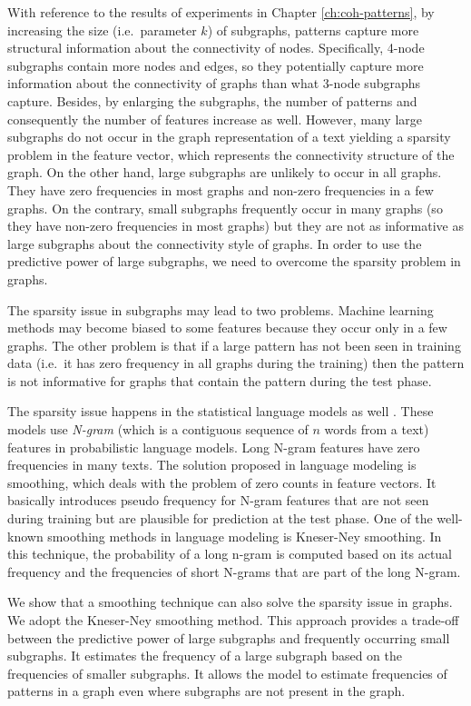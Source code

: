 With reference to the results of experiments in Chapter \ref{ch:coh-patterns}, 
by increasing the size (i.e.\ parameter $k$) of subgraphs, patterns capture more
structural information about the connectivity of nodes. 
Specifically, 4-node subgraphs contain more nodes and edges, so they potentially capture more information about the connectivity of graphs than what 3-node subgraphs capture.  
Besides, by enlarging the subgraphs, the number of patterns and consequently the number of features increase as well.   
However, many large subgraphs do not occur in the graph representation of a text yielding a sparsity problem in the feature vector, which represents the connectivity structure of the graph.  
On the other hand, large subgraphs are unlikely to occur in all graphs. 
They have zero frequencies in most graphs and non-zero frequencies in a few graphs.  
On the contrary, small subgraphs frequently occur in many graphs (so they have non-zero frequencies in most graphs) but
they are not as informative as large subgraphs about the
connectivity style of graphs. 
In order to use the predictive power of large subgraphs, we need to overcome the sparsity problem in graphs. 
  
The sparsity issue in subgraphs may lead to two problems. 
Machine learning methods may become biased to some features because they occur only in a few graphs. 
The other problem is that if a large pattern has not been seen in training data (i.e.\ it has zero frequency in all graphs during the training) then the pattern is not informative for graphs that contain the pattern during the test phase.  

The sparsity issue happens in the statistical language models as well \cite{jurafsky08}. 
These models use \emph{N-gram} (which is a contiguous sequence of $n$ words from a text) features in probabilistic language models. 
Long N-gram features have zero frequencies in many texts.  
The solution proposed in language modeling is smoothing, which deals with the problem of zero counts in feature vectors. 
It basically introduces pseudo frequency for N-gram features that are not seen during training but are plausible for prediction at the test phase. 
One of the \mbox{well-known} smoothing methods in language modeling is \mbox{Kneser-Ney} smoothing. 
In this technique, the probability of a long n-gram is computed based on its actual frequency and the frequencies of short N-grams that are part of the long N-gram. 

We show that a smoothing technique can also solve the sparsity issue in graphs.  
We adopt the \mbox{Kneser-Ney} smoothing method.   
This approach provides a trade-off between the predictive power of large subgraphs and frequently occurring small subgraphs. 
It estimates the frequency of a large subgraph based on the frequencies of smaller subgraphs. 
It allows the model to estimate frequencies of patterns in a graph even where subgraphs are not present in the graph. 

